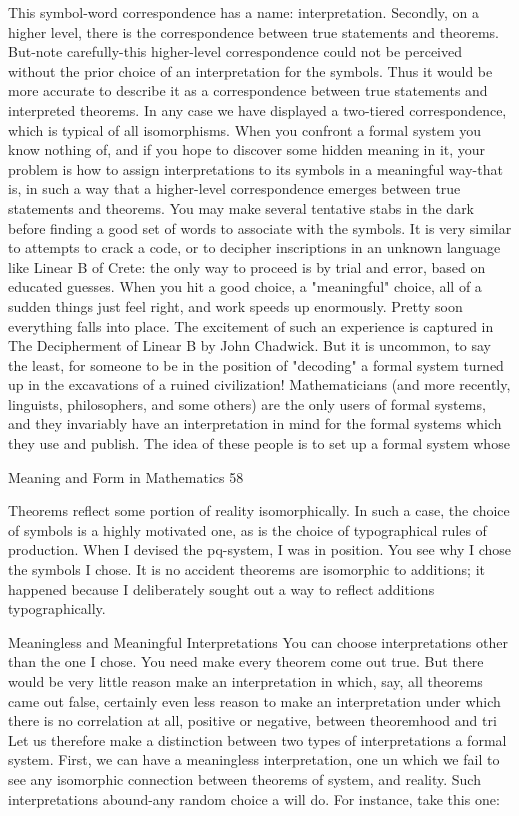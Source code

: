This symbol-word correspondence has a name: interpretation.
        Secondly, on a higher level, there is the correspondence between true statements
and theorems. But-note carefully-this higher-level correspondence could not be perceived
without the prior choice of an interpretation for the symbols. Thus it would be more
accurate to describe it as a correspondence between true statements and interpreted
theorems. In any case we have displayed a two-tiered correspondence, which is typical of
all isomorphisms.
        When you confront a formal system you know nothing of, and if you hope to
discover some hidden meaning in it, your problem is how to assign interpretations to its
symbols in a meaningful way-that is, in such a way that a higher-level correspondence
emerges between true statements and theorems. You may make several tentative stabs in
the dark before finding a good set of words to associate with the symbols. It is very
similar to attempts to crack a code, or to decipher inscriptions in an unknown language
like Linear B of Crete: the only way to proceed is by trial and error, based on educated
guesses. When you hit a good choice, a "meaningful" choice, all of a sudden things just
feel right, and work speeds up enormously. Pretty soon everything falls into place. The
excitement of such an experience is captured in The Decipherment of Linear B by John
Chadwick.
        But it is uncommon, to say the least, for someone to be in the position of
"decoding" a formal system turned up in the excavations of a ruined civilization!
Mathematicians (and more recently, linguists, philosophers, and some others) are the only
users of formal systems, and they invariably have an interpretation in mind for the formal
systems which they use and publish. The idea of these people is to set up a formal system
whose




Meaning and Form in Mathematics                                                        58

Theorems reflect some portion of reality isomorphically. In such a case, the choice of
symbols is a highly motivated one, as is the choice of typographical rules of production.
When I devised the pq-system, I was in position. You see why I chose the symbols I
chose. It is no accident theorems are isomorphic to additions; it happened because I
deliberately sought out a way to reflect additions typographically.

                Meaningless and Meaningful Interpretations
        You can choose interpretations other than the one I chose. You need make every
theorem come out true. But there would be very little reason make an interpretation in
which, say, all theorems came out false, certainly even less reason to make an
interpretation under which there is no correlation at all, positive or negative, between
theoremhood and tri Let us therefore make a distinction between two types of
interpretations a formal system. First, we can have a meaningless interpretation, one un
which we fail to see any isomorphic connection between theorems of system, and reality.
Such interpretations abound-any random choice a will do. For instance, take this one:

